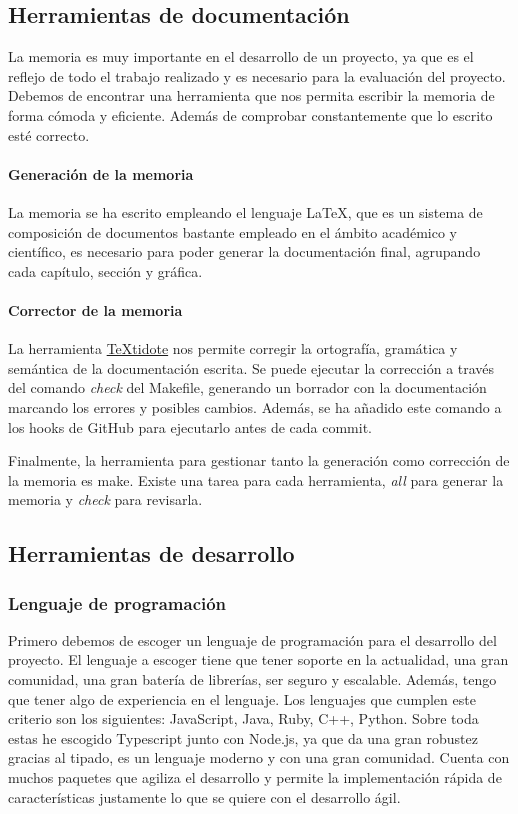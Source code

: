 \subsection{Herramientas de documentación}
La memoria es muy importante en el desarrollo de un proyecto, ya que es el reflejo de todo el trabajo realizado y es necesario para la evaluación del proyecto.
Debemos de encontrar una herramienta que nos permita escribir la memoria de forma cómoda y eficiente. Además de comprobar constantemente que lo escrito esté correcto.

\paragraph*{Generación de la memoria}
La memoria se ha escrito empleando el lenguaje LaTeX, que es un sistema de composición de documentos bastante empleado
en el ámbito académico y científico, es necesario para poder generar la documentación final, agrupando cada capítulo, sección y
gráfica.

\paragraph*{Corrector de la memoria}
La herramienta \href{https://github.com/sylvainhalle/textidote}{TeXtidote} nos permite corregir la ortografía, gramática y semántica de la documentación escrita. Se puede ejecutar la corrección a través del comando \textit{check} del Makefile,
generando un borrador con la documentación marcando los errores y posibles cambios. Además, se ha añadido este comando a los hooks de GitHub para ejecutarlo antes de cada commit.

Finalmente, la herramienta para gestionar tanto la generación como corrección de la memoria es make. Existe una tarea para cada herramienta, \textit{all} para generar la memoria y \textit{check} para revisarla.

\subsection{Herramientas de desarrollo}

\subsubsection*{Lenguaje de programación}
Primero debemos de escoger un lenguaje de programación para el desarrollo del proyecto.
El lenguaje a escoger tiene que tener soporte en la actualidad, una gran comunidad, una gran batería de librerías, ser seguro y escalable.
Además, tengo que tener algo de experiencia en el lenguaje. Los lenguajes que cumplen este criterio son los siguientes: JavaScript, Java, Ruby, C++, Python.
Sobre toda estas he escogido Typescript junto con Node.js, ya que da una gran robustez gracias al tipado, es un lenguaje moderno y con una gran comunidad.
Cuenta con muchos paquetes que agiliza el desarrollo y permite la implementación rápida de características justamente lo que se quiere con el desarrollo ágil.

